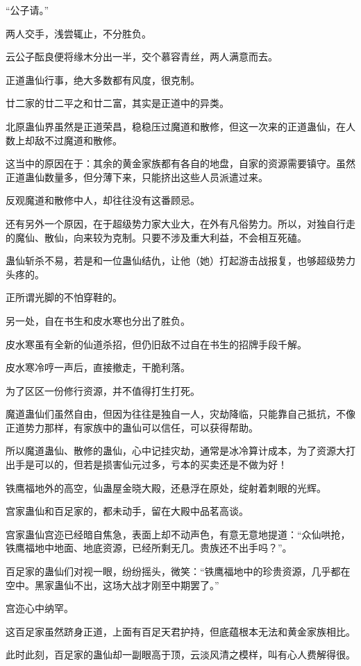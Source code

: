 \begin{this_body}
“公子请。”

两人交手，浅尝辄止，不分胜负。

云公子酝良便将缘木分出一半，交个慕容青丝，两人满意而去。

正道蛊仙行事，绝大多数都有风度，很克制。

廿二家的廿二平之和廿二富，其实是正道中的异类。

北原蛊仙界虽然是正道荣昌，稳稳压过魔道和散修，但这一次来的正道蛊仙，在人数上却敌不过魔道和散修。

这当中的原因在于：其余的黄金家族都有各自的地盘，自家的资源需要镇守。虽然正道蛊仙数量多，但分薄下来，只能挤出这些人员派遣过来。

反观魔道和散修中人，却往往没有这番顾忌。

还有另外一个原因，在于超级势力家大业大，在外有凡俗势力。所以，对独自行走的魔仙、散仙，向来较为克制。只要不涉及重大利益，不会相互死磕。

蛊仙斩杀不易，若是和一位蛊仙结仇，让他（她）打起游击战报复，也够超级势力头疼的。

正所谓光脚的不怕穿鞋的。

另一处，自在书生和皮水寒也分出了胜负。

皮水寒虽有全新的仙道杀招，但仍旧敌不过自在书生的招牌手段千解。

皮水寒冷哼一声后，直接撤走，干脆利落。

为了区区一份修行资源，并不值得打生打死。

魔道蛊仙们虽然自由，但因为往往是独自一人，灾劫降临，只能靠自己抵抗，不像正道势力那样，有家族中的蛊仙可以信任，可以获得帮助。

所以魔道蛊仙、散修的蛊仙，心中记挂灾劫，通常是冰冷算计成本，为了资源大打出手是可以的，但若是损害仙元过多，亏本的买卖还是不做为好！

铁鹰福地外的高空，仙蛊屋金晓大殿，还悬浮在原处，绽射着刺眼的光辉。

宫家蛊仙和百足家的，都未动手，留在大殿中品茗高谈。

宫家蛊仙宫迩已经暗自焦急，表面上却不动声色，有意无意地提道：“众仙哄抢，铁鹰福地中地面、地底资源，已经所剩无几。贵族还不出手吗？”。

百足家的蛊仙们对视一眼，纷纷摇头，微笑：“铁鹰福地中的珍贵资源，几乎都在空中。黑家蛊仙不出，这场大战才刚至中期罢了。”

宫迩心中纳罕。

这百足家虽然跻身正道，上面有百足天君护持，但底蕴根本无法和黄金家族相比。

此时此刻，百足家的蛊仙却一副眼高于顶，云淡风清之模样，叫有心人费解得很。

\end{this_body}

